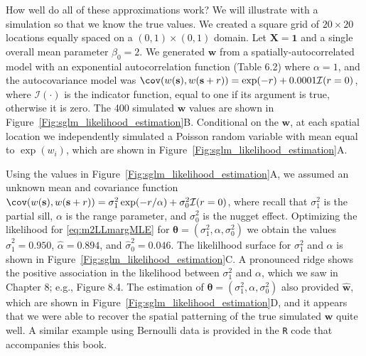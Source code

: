 \documentclass[12pt, titlepage]{article}
\begin{document}
How well do all of these approximations work?  We will illustrate with a simulation so that we know the true values.  We created a square grid of $20 \times 20$ locations equally spaced on a $(0,1) \times (0,1)$ domain. Let $\mathbf{X} = \mathbf{1}$ and a single overall mean parameter $\beta_{0} = 2$.  We generated $\mathbf{w}$ from a spatially-autocorrelated model with an exponential autocorrelation function (Table 6.2) where $\alpha = 1$, and the autocovariance model was $\cov(w(\mathbf{s}),w(\mathbf{s} + r)) = \exp(-r) + 0.0001\mathcal{I}(r = 0)$, where $\mathcal{I}(\cdot)$ is the indicator function, equal to one if its argument is true, otherwise it is zero.  The 400 simulated $\mathbf{w}$ values are shown in Figure~\ref{Fig:sglm_likelihood_estimation}B.  Conditional on the $\mathbf{w}$, at each spatial location we independently simulated a Poisson random variable with mean equal to $\exp(w_{i})$, which are shown in Figure~\ref{Fig:sglm_likelihood_estimation}A.

Using the values in Figure~\ref{Fig:sglm_likelihood_estimation}A, we assumed an unknown mean and covariance function $\cov(w(\mathbf{s}),w(\mathbf{s} + r)) = \sigma_{1}^{2}\exp(-r/\alpha) + \sigma^{2}_{0}\mathcal{I}(r = 0)$, where recall that $\sigma_{1}^{2}$ is the partial sill, $\alpha$ is the range parameter, and $\sigma_{0}^{2}$ is the nugget effect.  Optimizing the likelihood for \eqref{eq:m2LLmargMLE} for $\boldsymbol{\theta} = (\sigma_{1}^{2},\alpha, \sigma_{0}^{2})$ we obtain the values $\hat{\sigma}_{1}^{2} = 0.950$, $\hat{\alpha} = 0.894$, and $\hat{\sigma}_{0}^{2} = 0.046$.  The likelilhood surface for $\sigma_{1}^{2}$ and $\alpha$ is shown in Figure~\ref{Fig:sglm_likelihood_estimation}C. A pronounced ridge shows the positive association in the likelihood between $\sigma_{1}^{2}$ and $\alpha$, which we saw in Chapter 8; e.g., Figure 8.4. The estimation of $\boldsymbol{\theta} = (\sigma_{1}^{2},\alpha, \sigma_{0}^{2})$ also provided $\hat{\mathbf{w}}$, which are shown in Figure~\ref{Fig:sglm_likelihood_estimation}D, and it appears that we were able to recover the spatial patterning of the true simulated $\mathbf{w}$ quite well.  A similar example using Bernoulli data is provided in the \texttt{R} code that accompanies this book.
\end{document}
